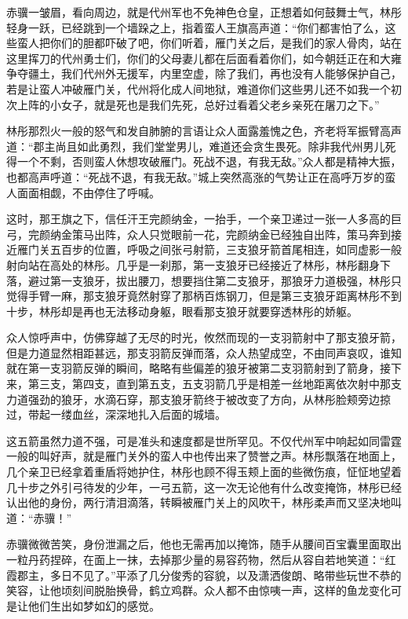 赤骥一皱眉，看向周边，就是代州军也不免神色仓皇，正想着如何鼓舞士气，林彤轻身一跃，已经跳到一个墙跺之上，指着蛮人王旗高声道：“你们都害怕了么，这些蛮人把你们的胆都吓破了吧，你们听着，雁门关之后，是我们的家人骨肉，站在这里挥刀的代州勇士们，你们的父母妻儿都在后面看着你们，如今朝廷正在和大雍争夺疆土，我们代州外无援军，内里空虚，除了我们，再也没有人能够保护自己，若是让蛮人冲破雁门关，代州将化成人间地狱，难道你们这些男儿还不如我一个初次上阵的小女子，就是死也是我们先死，总好过看着父老乡亲死在屠刀之下。”

林彤那烈火一般的怒气和发自肺腑的言语让众人面露羞愧之色，齐老将军振臂高声道：“郡主尚且如此勇烈，我们堂堂男儿，难道还会贪生畏死。除非我代州男儿死得一个不剩，否则蛮人休想攻破雁门。死战不退，有我无敌。”众人都是精神大振，也都高声呼道：“死战不退，有我无敌。”城上突然高涨的气势让正在高呼万岁的蛮人面面相觑，不由停住了呼喊。

这时，那王旗之下，信任汗王完颜纳金，一抬手，一个亲卫递过一张一人多高的巨弓，完颜纳金策马出阵，众人只觉眼前一花，完颜纳金已经独自出阵，策马奔到接近雁门关五百步的位置，呼吸之间张弓射箭，三支狼牙箭首尾相连，如同虚影一般射向站在高处的林彤。几乎是一刹那，第一支狼牙已经接近了林彤，林彤翻身下落，避过第一支狼牙，拔出腰刀，想要挡住第二支狼牙，那狼牙力道极强，林彤只觉得手臂一麻，那支狼牙竟然射穿了那柄百炼钢刀，但是第三支狼牙距离林彤不到十步，林彤却是再也无法移动身躯，眼看那支狼牙就要穿透林彤的娇躯。

众人惊呼声中，仿佛穿越了无尽的时光，攸然而现的一支羽箭射中了那支狼牙箭，但是力道显然相距甚远，那支羽箭反弹而落，众人热望成空，不由同声哀叹，谁知就在第一支羽箭反弹的瞬间，略略有些偏差的狼牙被第二支羽箭射到了箭身，接下来，第三支，第四支，直到第五支，五支羽箭几乎是相差一丝地距离依次射中那支力道强劲的狼牙，水滴石穿，那支狼牙箭终于被改变了方向，从林彤脸颊旁边掠过，带起一缕血丝，深深地扎入后面的城墙。

这五箭虽然力道不强，可是准头和速度都是世所罕见。不仅代州军中响起如同雷霆一般的叫好声，就是雁门关外的蛮人中也传出来了赞誉之声。林彤飘落在地面上，几个亲卫已经拿着重盾将她护住，林彤也顾不得玉颊上面的些微伤痕，怔怔地望着几十步之外引弓待发的少年，一弓五箭，这一次无论他有什么改变掩饰，林彤已经认出他的身份，两行清泪滴落，转瞬被雁门关上的风吹干，林彤柔声而又坚决地叫道：“赤骥！”

赤骥微微苦笑，身份泄漏之后，他也无需再加以掩饰，随手从腰间百宝囊里面取出一粒丹药捏碎，在面上一抹，去掉那少量的易容药物，然后从容自若地笑道：“红霞郡主，多日不见了。”平添了几分俊秀的容貌，以及潇洒俊朗、略带些玩世不恭的笑容，让他顷刻间脱胎换骨，鹤立鸡群。众人都不由惊咦一声，这样的鱼龙变化可是让他们生出如梦如幻的感觉。

